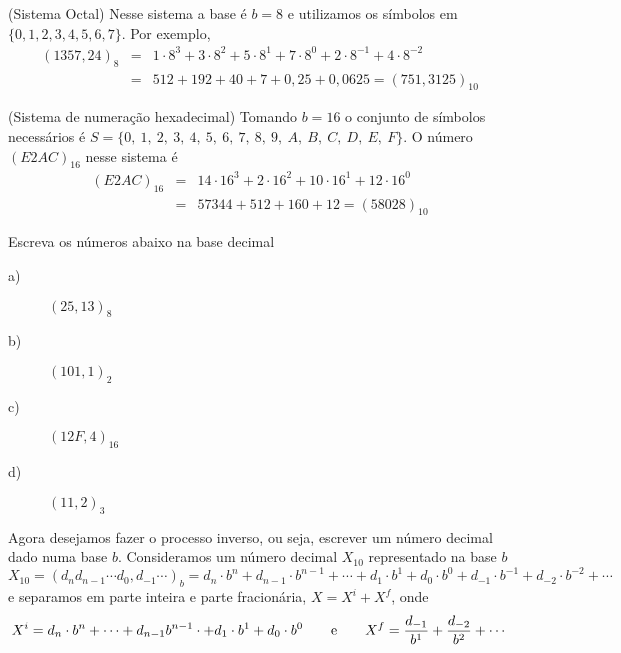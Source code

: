 \begin{ex} (Sistema Octal)
Nesse sistema a base é $b=8$ e utilizamos os símbolos em $\{0, 1, 2, 3, 4, 5, 6, 7\}$. Por exemplo,
\begin{eqnarray*}
(1357,24)_{8}&=&1\cdot 8^3+3\cdot 8^2+5\cdot 8^1+7\cdot 8^{0}+2\cdot 8^{-1}+4\cdot 8^{-2}\\&=&512+192+40+7+0,25+0,0625=(751,3125)_{10}
\end{eqnarray*}
\end{ex}


\begin{ex} (Sistema de numeração hexadecimal) Tomando $b=16$  o conjunto de símbolos necessários é  $S=\{0,\ 1,\ 2,\ 3,\ 4,\ 5,\ 6,\ 7,\ 8,\ 9,\ A,\ B,\ C,\ D,\ E,\ F\}$. O número $(E2AC)_{16}$ nesse sistema é
\begin{eqnarray*}
(E2AC)_{16}&=&14\cdot 16^3+2\cdot 16^2+10\cdot 16^1+12\cdot 16^{0}\\&=&57344+512+160+12=(58028)_{10}
\end{eqnarray*}
\end{ex}

\begin{prob}Escreva os números abaixo na base decimal
\begin{description}
\item[a)] $(25,13)_8$
\item[b)] $(101,1)_2$
\item[c)] $(12F,4)_{16}$
\item[d)] $(11,2)_{3}$
\end{description}
\end{prob}

Agora desejamos fazer o processo inverso, ou seja, escrever um número decimal dado numa base $b$. Consideramos um número decimal $X_{10}$ representado na base $b$
$$
X_{10}=(d_nd_{n-1}\cdots d_0,d_{-1}\cdots)_{b}=d_n\cdot b^{n}+d_{n-1}\cdot b^{n-1}+\cdots +d_1\cdot b^1+d_0\cdot b^0+d_{-1}\cdot b^{-1}+d_{-2}\cdot b^{-2}+\cdots
$$
e separamos em parte inteira e parte fracionária, $X=X^{i}+X^{f}$, onde
$$
X^{i}=d_n\cdot b^{n}+ \cdots+d_{n-1}b^{n-1} \cdot  +d_1\cdot b^1 +d_0\cdot b^0 \qquad \hbox{e}\qquad X^{f}
= \frac{d_{-1}}{b^1}+\frac{d_{-2}}{b^{2}}+\cdots
$$

